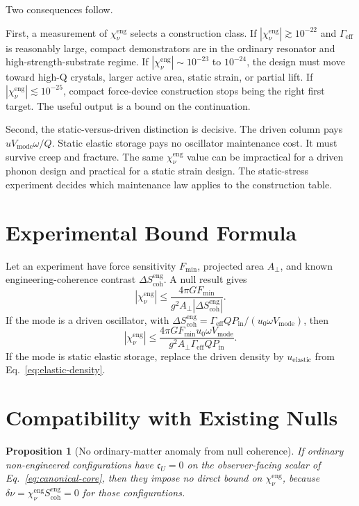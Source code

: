 \documentclass[11pt]{article}
\numberwithin{equation}{section}
\newtheorem{proposition}[theorem]{Proposition}
\theoremstyle{remark}
\newcommand{\chieng}{\chi_\nu^{\mathrm{eng}}}
\newcommand{\scoheng}{S_{\mathrm{coh}}^{\mathrm{eng}}}
\newcommand{\Gammaeff}{\Gamma_{\mathrm{eff}}}
\begin{document}
Two consequences follow.

First, a measurement of \(\chieng\) selects a construction class. If
\(|\chieng|\gtrsim10^{-22}\) and \(\Gammaeff\) is reasonably large, compact
demonstrators are in the ordinary resonator and high-strength-substrate regime.
If \(|\chieng|\sim10^{-23}\) to \(10^{-24}\), the design must move toward high-Q
crystals, larger active area, static strain, or partial lift. If
\(|\chieng|\lesssim10^{-25}\), compact force-device construction stops being the
right first target. The useful output is a bound on the continuation.

Second, the static-versus-driven distinction is decisive. The driven column pays
\(uV_{\mathrm{mode}}\omega/Q\). Static elastic storage pays no oscillator
maintenance cost. It must survive creep and fracture. The same
\(\chieng\) value can be impractical for a driven phonon design and practical for
a static strain design. The static-stress experiment decides which maintenance
law applies to the construction table.

\section{Experimental Bound Formula}

Let an experiment have force sensitivity \(F_{\min}\), projected area
\(A_\perp\), and known engineering-coherence contrast \(\Delta\scoheng\). A null result gives
\begin{equation}
\boxed{
|\chieng|
\le
\frac{4\pi G F_{\min}}{g^2 A_\perp|\Delta\scoheng|}.
}
\label{eq:null-bound-general}
\end{equation}
If the mode is a driven oscillator, with
\(\Delta\scoheng=\Gammaeff QP_{\mathrm{in}}/(u_0\omega V_{\mathrm{mode}})\), then
\begin{equation}
\boxed{
|\chieng|
\le
\frac{4\pi G F_{\min}u_0\omega V_{\mathrm{mode}}}
{g^2 A_\perp\Gammaeff QP_{\mathrm{in}}}.
}
\label{eq:null-bound-driven}
\end{equation}
If the mode is static elastic storage, replace the driven density by
\(u_{\mathrm{elastic}}\) from Eq.~\eqref{eq:elastic-density}.

\section{Compatibility with Existing Nulls}

\begin{proposition}[No ordinary-matter anomaly from null coherence]
If ordinary non-engineered configurations have \(\mathfrak c_U=0\) on the
observer-facing scalar of Eq.~\eqref{eq:canonical-core}, then they impose no direct
bound on \(\chieng\), because \(\delta\nu=\chieng\scoheng=0\) for those
configurations.
\end{proposition}
\end{document}
